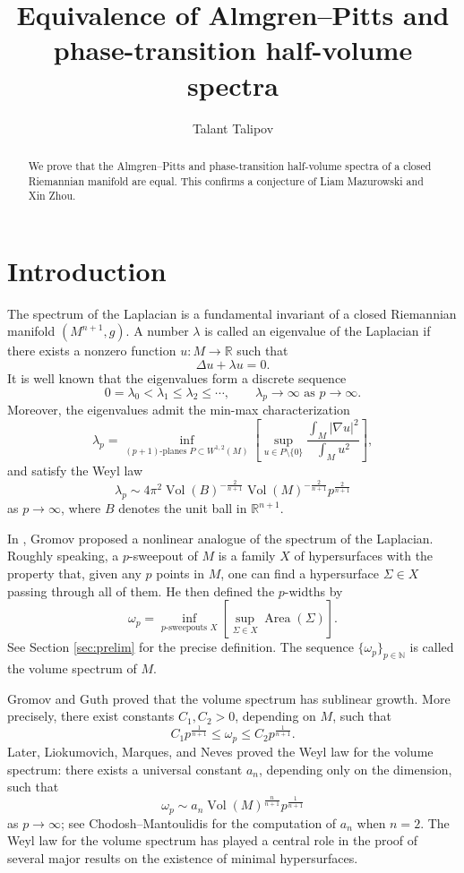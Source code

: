 \documentclass[12pt,english]{article}
\title{Equivalence of Almgren--Pitts and phase-transition half-volume spectra}
\author{Talant Talipov}
\date{}
\theoremstyle{definition}
\begin{document}
\thispagestyle{empty}
\maketitle

\begin{abstract}
We prove that the Almgren--Pitts and phase-transition half-volume spectra of a closed Riemannian manifold are equal. This confirms a conjecture of Liam Mazurowski and Xin Zhou.
\end{abstract}

\section{Introduction}
\label{sec:intro}

The spectrum of the Laplacian is a fundamental invariant of a closed Riemannian manifold $(M^{n+1},g)$. A number $\lambda$ is called an eigenvalue of the Laplacian if there exists a nonzero function $u:M\to\mathbb{R}$ such that
\[
\Delta u + \lambda u = 0.
\]
It is well known that the eigenvalues form a discrete sequence
\[
0=\lambda_0<\lambda_1\le \lambda_2\le \cdots,
\qquad \lambda_p\to\infty \text{ as } p\to\infty.
\]
Moreover, the eigenvalues admit the min-max characterization
\[
\lambda_p=\inf_{(p+1)\text{-planes }P\subset W^{1,2}(M)}
\left[\sup_{u\in P\setminus\{0\}}
\frac{\int_M |\nabla u|^2}{\int_M u^2}\right],
\]
and satisfy the Weyl law
\[
\lambda_p\sim 4\pi^2 \operatorname{Vol}(B)^{-\frac{2}{n+1}}
\operatorname{Vol}(M)^{-\frac{2}{n+1}} p^{\frac{2}{n+1}}
\]
as $p\to\infty$, where $B$ denotes the unit ball in $\mathbb{R}^{n+1}$.

In \cite{G}, Gromov proposed a nonlinear analogue of the spectrum of the Laplacian. Roughly speaking, a $p$-sweepout of $M$ is a family $X$ of hypersurfaces with the property that, given any $p$ points in $M$, one can find a hypersurface $\Sigma\in X$ passing through all of them. He then defined the $p$-widths by
\[
\omega_p=\inf_{p\text{-sweepouts }X}
\left[\sup_{\Sigma\in X}\operatorname{Area}(\Sigma)\right].
\]
See Section \ref{sec:prelim} for the precise definition. The sequence $\{\omega_p\}_{p\in\mathbb N}$ is called the volume spectrum of $M$.

Gromov \cite{G1} and Guth \cite{Gu} proved that the volume spectrum has sublinear growth. More precisely, there exist constants $C_1,C_2>0$, depending on $M$, such that
\[
C_1 p^{\frac{1}{n+1}}\le \omega_p\le C_2 p^{\frac{1}{n+1}}.
\]
Later, Liokumovich, Marques, and Neves \cite{LMN} proved the Weyl law for the volume spectrum: there exists a universal constant $a_n$, depending only on the dimension, such that
\[
\omega_p\sim a_n \operatorname{Vol}(M)^{\frac{n}{n+1}}p^{\frac{1}{n+1}}
\]
as $p\to\infty$; see Chodosh--Mantoulidis \cite{CM2} for the computation of $a_n$ when $n=2$. The Weyl law for the volume spectrum has played a central role in the proof of several major results on the existence of minimal hypersurfaces.
\end{document}
